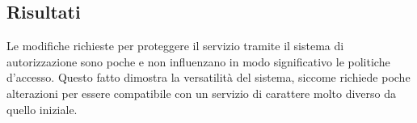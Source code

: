 \subsection{Risultati}
Le modifiche richieste per proteggere il servizio tramite il sistema di autorizzazione sono poche e 
non influenzano in modo significativo le politiche d'accesso. Questo fatto dimostra la versatilità del sistema, 
siccome richiede poche alterazioni per essere compatibile con un servizio di carattere molto diverso 
da quello iniziale.   

